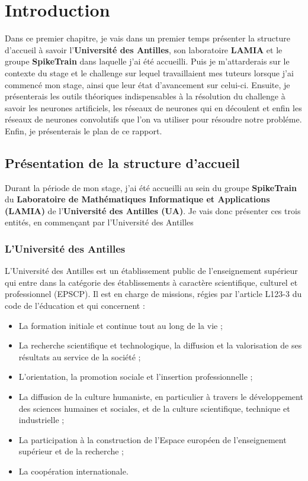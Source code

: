 \hypertarget{Introduction}{%
\chapter{Introduction}\label{Introduction}}

Dans ce premier chapitre, je vais dans un premier temps présenter la structure
d'accueil à savoir l'\textbf{Université des Antilles}, son laboratoire
\textbf{LAMIA} et le groupe \textbf{SpikeTrain} dans laquelle j'ai été
accueilli.
Puis je m'attarderais sur le contexte du stage et le challenge sur lequel
travaillaient mes tuteurs lorsque j'ai commencé mon stage, ainsi que leur état
d'avancement sur celui-ci.
Ensuite, je présenterais les outils théoriques indispensables à la résolution du
challenge à savoir les neurones artificiels, les réseaux de neurones qui en
découlent et enfin les réseaux de neurones convolutifs que l'on va utiliser pour
résoudre notre probléme. Enfin, je présenterais le plan de ce rapport.

\section{Présentation de la structure
d'accueil}

Durant la période de mon stage, j'ai été accueilli au sein du groupe \textbf{SpikeTrain} du
\textbf{Laboratoire de Mathématiques Informatique et Applications
(LAMIA)} de l'\textbf{Université des Antilles (UA)}.
Je vais donc présenter ces trois entités, en commençant par l'Université des Antilles

\hypertarget{lUniversite-des-antilles}{%
\subsection{L'Université des Antilles}\label{luniversite-des-antilles}}

L'Université des Antilles est un établissement public de l'enseignement supérieur qui entre dans la catégorie des établissements à  caractère scientifique, culturel et professionnel (EPSCP).
Il est en charge de missions, régies par l'article L123-3 du code de l'éducation et qui concernent :
\begin{itemize}
\item La formation initiale et continue tout au long de la vie ;
\item La recherche scientifique et technologique, la diffusion et la valorisation de ses résultats au service de la société ;
\item L’orientation, la promotion sociale et l’insertion professionnelle ;
\item La diffusion de la culture humaniste, en particulier à travers le développement des sciences humaines et sociales, et de la culture scientifique, technique et industrielle ;
\item La participation à la construction de l’Espace européen de l’enseignement supérieur et de la recherche ;
\item La coopération internationale.
\end{itemize}

